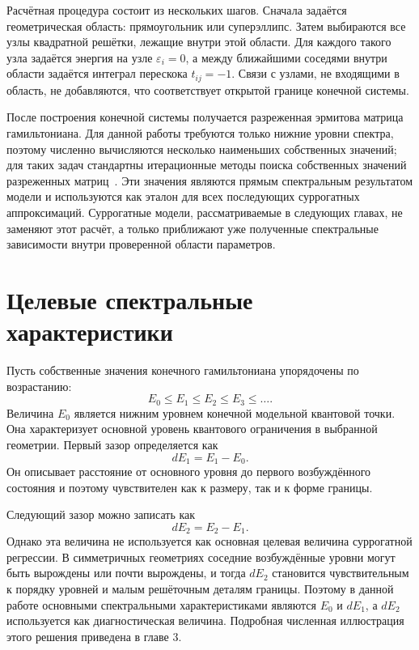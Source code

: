 Расчётная процедура состоит из нескольких шагов. Сначала задаётся геометрическая область:
прямоугольник или суперэллипс. Затем выбираются все узлы квадратной решётки, лежащие
внутри этой области. Для каждого такого узла задаётся энергия на узле $\varepsilon_i=0$, а
между ближайшими соседями внутри области задаётся интеграл перескока $t_{ij}=-1$. Связи с
узлами, не входящими в область, не добавляются, что соответствует открытой границе
конечной системы.

После построения конечной системы получается разреженная эрмитова матрица гамильтониана.
Для данной работы требуются только нижние уровни спектра, поэтому численно вычисляются
несколько наименьших собственных значений; для таких задач стандартны итерационные методы
поиска собственных значений разреженных матриц~\cite{lehoucq1998arpack}. Эти значения
являются прямым спектральным результатом модели и используются как эталон для всех
последующих суррогатных аппроксимаций. Суррогатные модели, рассматриваемые в следующих
главах, не заменяют этот расчёт, а только приближают уже полученные спектральные
зависимости внутри проверенной области параметров.

\section{Целевые спектральные характеристики}

Пусть собственные значения конечного гамильтониана упорядочены по возрастанию:
\begin{equation}
  E_0 \leq E_1 \leq E_2 \leq E_3 \leq \ldots .
\end{equation}
Величина $E_0$ является нижним уровнем конечной модельной квантовой точки. Она
характеризует основной уровень квантового ограничения в выбранной геометрии. Первый зазор
определяется как
\begin{equation}
  dE_1 = E_1 - E_0 .
\end{equation}
Он описывает расстояние от основного уровня до первого возбуждённого состояния и поэтому
чувствителен как к размеру, так и к форме границы.

Следующий зазор можно записать как
\begin{equation}
  dE_2 = E_2 - E_1 .
\end{equation}
Однако эта величина не используется как основная целевая величина суррогатной регрессии. В
симметричных геометриях соседние возбуждённые уровни могут быть вырождены или почти
вырождены, и тогда $dE_2$ становится чувствительным к порядку уровней и малым решёточным
деталям границы. Поэтому в данной работе основными спектральными характеристиками являются
$E_0$ и $dE_1$, а $dE_2$ используется как диагностическая величина. Подробная численная
иллюстрация этого решения приведена в главе 3.

